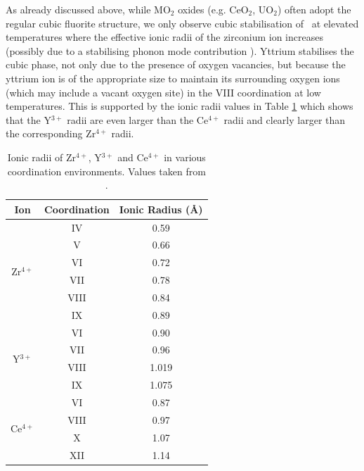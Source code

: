 As already discussed above, while MO$_{2}$ oxides (e.g. CeO$_{2}$, UO$_{2}$) often adopt the regular cubic fluorite structure, we only observe cubic stabilisation  of \zirconia\ at elevated temperatures where the effective ionic radii of the zirconium ion increases (possibly due to a stabilising phonon mode contribution \cite{Mirgorodsky1999, Perry1990, Simeone2003}). Yttrium stabilises the cubic phase, not only due to the presence of oxygen vacancies, but because the yttrium ion is of the appropriate size to maintain its surrounding oxygen ions (which may include a vacant oxygen site) in the VIII coordination at low temperatures. This is supported by the ionic radii values in Table \ref{figure:ionicradii} which shows that the Y$^{3+}$ radii are even larger than the Ce$^{4+}$ radii and clearly larger than the corresponding Zr$^{4+}$ radii. 


\begin{table}[ht]
\onehalfspacing
\centering
\caption[Ionic radii of Zr$^{4+}$, Y$^{3+}$ and Ce$^{4+}$ in various coordination environments.]{Ionic radii of Zr$^{4+}$, Y$^{3+}$ and Ce$^{4+}$ in various coordination environments. Values taken from \cite{Shannon1976}.}
\label{figure:ionicradii}
\begin{tabular}{ccc}
\hline
Ion & Coordination & Ionic Radius (\r{A}) \\ \hline
\multicolumn{1}{c}{\multirow{6}{*}{Zr$^{4+}$}} & \multicolumn{1}{c}{IV} & 0.59 \\
\multicolumn{1}{c}{} & \multicolumn{1}{c}{V} & 0.66 \\
\multicolumn{1}{c}{} & \multicolumn{1}{c}{VI} & 0.72 \\
\multicolumn{1}{c}{} & \multicolumn{1}{c}{VII} & 0.78 \\
\multicolumn{1}{c}{} & \multicolumn{1}{c}{VIII} & 0.84 \\
\multicolumn{1}{c}{} & \multicolumn{1}{c}{IX} & 0.89 \\ \hline
\multicolumn{1}{c}{\multirow{4}{*}{Y$^{3+}$}} & \multicolumn{1}{c}{VI} & 0.90 \\
\multicolumn{1}{c}{} & \multicolumn{1}{c}{VII} & 0.96 \\
\multicolumn{1}{c}{} & \multicolumn{1}{c}{VIII} & 1.019 \\
\multicolumn{1}{c}{} & \multicolumn{1}{c}{IX} & 1.075 \\ \hline
\multicolumn{1}{c}{\multirow{4}{*}{Ce$^{4+}$}} & \multicolumn{1}{c}{VI} & 0.87 \\
\multicolumn{1}{c}{} & \multicolumn{1}{c}{VIII} & 0.97 \\
\multicolumn{1}{c}{} & \multicolumn{1}{c}{X} & 1.07 \\
\multicolumn{1}{c}{} & \multicolumn{1}{c}{XII} & 1.14 \\ \hline
\end{tabular}
\end{table}

